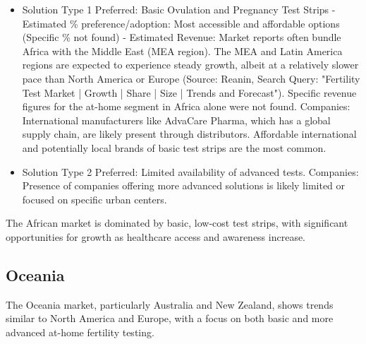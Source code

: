 \documentclass{article}
\begin{document}
\begin{itemize}
  \item Solution Type 1 Preferred: Basic Ovulation and Pregnancy Test Strips - Estimated \% preference/adoption: Most accessible and affordable options (Specific \% not found) - Estimated Revenue: Market reports often bundle Africa with the Middle East (MEA region). The MEA and Latin America regions are expected to experience steady growth, albeit at a relatively slower pace than North America or Europe (Source: Reanin, Search Query: "Fertility Test Market | Growth | Share | Size | Trends and Forecast"). Specific revenue figures for the at-home segment in Africa alone were not found.
    Companies: International manufacturers like AdvaCare Pharma, which has a global supply chain, are likely present through distributors. Affordable international and potentially local brands of basic test strips are the most common.
  \item Solution Type 2 Preferred: Limited availability of advanced tests.
    Companies: Presence of companies offering more advanced solutions is likely limited or focused on specific urban centers.
\end{itemize}
The African market is dominated by basic, low-cost test strips, with significant opportunities for growth as healthcare access and awareness increase.

\subsection{Oceania}
The Oceania market, particularly Australia and New Zealand, shows trends similar to North America and Europe, with a focus on both basic and more advanced at-home fertility testing.
\end{document}
